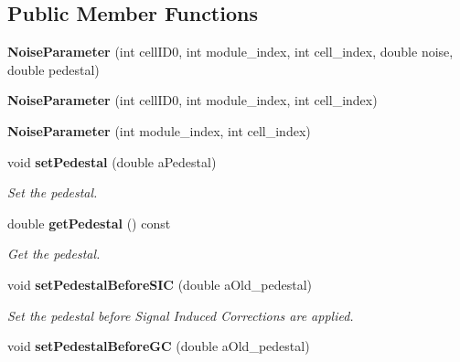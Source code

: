 \subsection*{Public Member Functions}
\begin{DoxyCompactItemize}
\item 
{\bfseries NoiseParameter} (int cellID0, int module\_\-index, int cell\_\-index, double noise, double pedestal)\label{classCALICE_1_1NoiseParameter_a5ae8a2eda536c5234c898a1fed313103}

\item 
{\bfseries NoiseParameter} (int cellID0, int module\_\-index, int cell\_\-index)\label{classCALICE_1_1NoiseParameter_adf999180ff627b662343e5069db133d7}

\item 
{\bfseries NoiseParameter} (int module\_\-index, int cell\_\-index)\label{classCALICE_1_1NoiseParameter_ac3ad7f004d153853a1e2a800a4018e29}

\item 
void {\bf setPedestal} (double aPedestal)\label{classCALICE_1_1NoiseParameter_a1b356206a293f69bf1ed40d27ecb818b}

\begin{DoxyCompactList}\small\item\em Set the pedestal. \item\end{DoxyCompactList}\item 
double {\bf getPedestal} () const \label{classCALICE_1_1NoiseParameter_adb7a5b09ba13a4f638df6d60b59c9587}

\begin{DoxyCompactList}\small\item\em Get the pedestal. \item\end{DoxyCompactList}\item 
void {\bf setPedestalBeforeSIC} (double aOld\_\-pedestal)\label{classCALICE_1_1NoiseParameter_a3388d4aae5f8d532667b38ac4e9af8a6}

\begin{DoxyCompactList}\small\item\em Set the pedestal before Signal Induced Corrections are applied. \item\end{DoxyCompactList}\item 
void {\bf setPedestalBeforeGC} (double aOld\_\-pedestal)\label{classCALICE_1_1NoiseParameter_ab20b21bb8db009637332f8b15471fc7f}


\end{DoxyCompactItemize}
